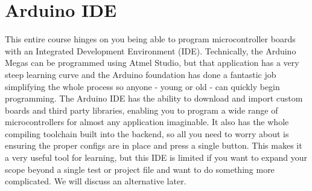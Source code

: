 





\section{Arduino IDE}
This entire course hinges on you being able to program microcontroller boards with an Integrated Development Environment (IDE).
Technically, the Arduino Megas can be programmed using Atmel Studio, but that application has a very steep learning curve and the Arduino foundation has done a fantastic job simplifying the whole process so anyone - young or old - can quickly begin programming.
The Arduino IDE has the ability to download and import custom boards and third party libraries, enabling you to program a wide range of microcontrollers for almost any application imaginable.
It also has the whole compiling toolchain built into the backend, so all you need to worry about is ensuring the proper configs are in place and press a single button.
This makes it a very useful tool for learning, but this IDE is limited if you want to expand your scope beyond a single test or project file and want to do something more complicated.
We will discuss an alternative later.

